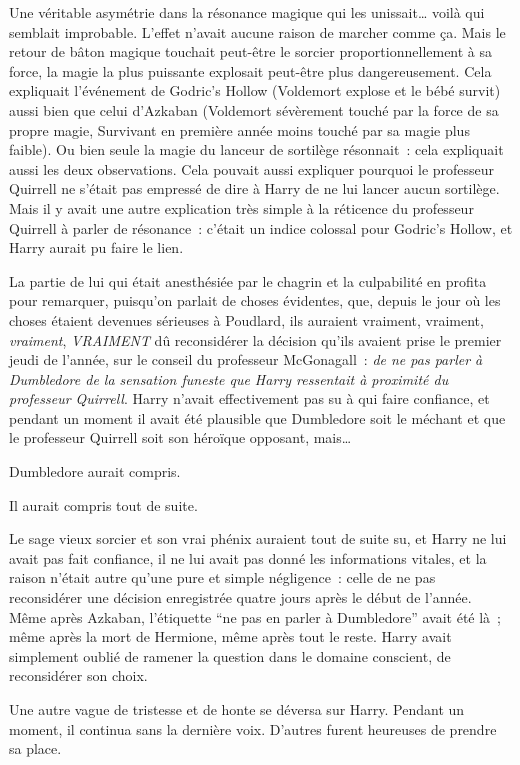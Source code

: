 Une véritable asymétrie dans la résonance magique qui les unissait… voilà qui semblait improbable. L'effet n'avait aucune raison de marcher comme ça. Mais le retour de bâton magique touchait peut-être le sorcier proportionnellement à sa force, la magie la plus puissante explosait peut-être plus dangereusement. Cela expliquait l'événement de Godric's Hollow (Voldemort explose et le bébé survit) aussi bien que celui d'Azkaban (Voldemort sévèrement touché par la force de sa propre magie, Survivant en première année moins touché par sa magie plus faible). Ou bien seule la magie du lanceur de sortilège résonnait~: cela expliquait aussi les deux observations. Cela pouvait aussi expliquer pourquoi le professeur Quirrell ne s'était pas empressé de dire à Harry de ne lui lancer aucun sortilège. Mais il y avait une autre explication très simple à la réticence du professeur Quirrell à parler de résonance~: c'était un indice colossal pour Godric's Hollow, et Harry aurait pu faire le lien.

La partie de lui qui était anesthésiée par le chagrin et la culpabilité en profita pour remarquer, puisqu'on parlait de choses évidentes, que, depuis le jour où les choses étaient devenues sérieuses à Poudlard, ils auraient vraiment, vraiment, \emph{vraiment}, \emph{VRAIMENT} dû reconsidérer la décision qu'ils avaient prise le premier jeudi de l'année, sur le conseil du professeur McGonagall~: \emph{de ne pas parler à Dumbledore de la sensation funeste que Harry ressentait à proximité du professeur Quirrell}. Harry n'avait effectivement pas su à qui faire confiance, et pendant un moment il avait été plausible que Dumbledore soit le méchant et que le professeur Quirrell soit son héroïque opposant, mais…

Dumbledore aurait compris.

Il aurait compris tout de suite.

Le sage vieux sorcier et son vrai phénix auraient tout de suite su, et Harry ne lui avait pas fait confiance, il ne lui avait pas donné les informations vitales, et la raison n'était autre qu'une pure et simple négligence~: celle de ne pas reconsidérer une décision enregistrée quatre jours après le début de l'année. Même après Azkaban, l'étiquette “ne pas en parler à Dumbledore” avait été là~; même après la mort de Hermione, même après tout le reste. Harry avait simplement oublié de ramener la question dans le domaine conscient, de reconsidérer son choix.

Une autre vague de tristesse et de honte se déversa sur Harry. Pendant un moment, il continua sans la dernière voix. D'autres furent heureuses de prendre sa place.

